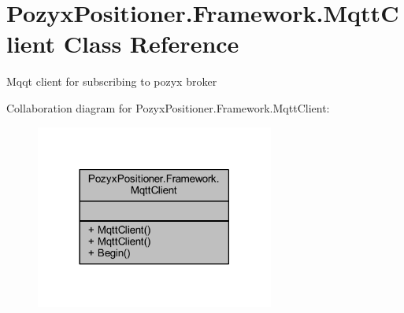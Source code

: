\hypertarget{class_pozyx_positioner_1_1_framework_1_1_mqtt_client}{}\section{Pozyx\+Positioner.\+Framework.\+Mqtt\+Client Class Reference}
\label{class_pozyx_positioner_1_1_framework_1_1_mqtt_client}


Mqqt client for subscribing to pozyx broker  




Collaboration diagram for Pozyx\+Positioner.\+Framework.\+Mqtt\+Client\+:
\nopagebreak
\begin{figure}[H]
\begin{center}
\leavevmode
\includegraphics[width=222pt]{class_pozyx_positioner_1_1_framework_1_1_mqtt_client__coll__graph}
\end{center}
\end{figure}
